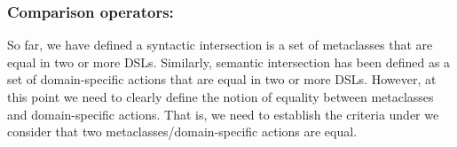 






\subsubsection{Comparison operators:} So far, we have defined a syntactic intersection is a set of metaclasses that are equal in two or more DSLs. Similarly, semantic intersection has been defined as a set of domain-specific actions that are equal in two or more DSLs. However, at this point we need to clearly define the notion of equality between metaclasses and domain-specific actions. That is, we need to establish the criteria under we consider that two metaclasses/domain-specific actions are equal.

